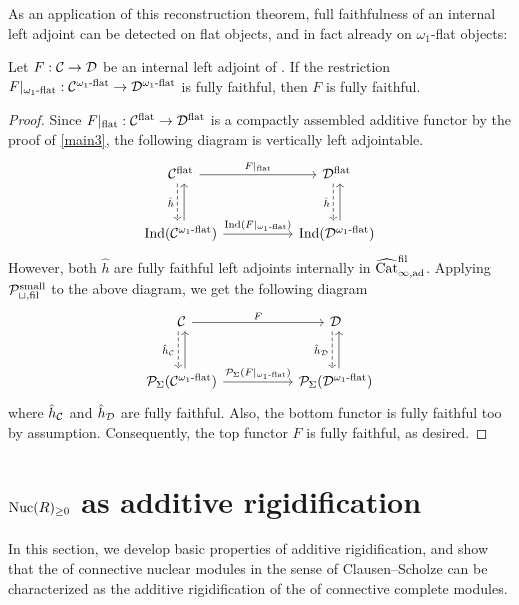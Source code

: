 \documentclass[a4paper,10pt, oneside]{amsart}
\begin{document}
	As an application of this reconstruction theorem, full faithfulness of an internal left adjoint can be detected on flat objects, and in fact already on \(\omega_1\)-flat objects:
	\begin{cor}
		Let $F:\mathcal{C}\to \mathcal{D}$ be an internal left adjoint of \dualaddinfcats. If the restriction $F|_{\omega_1\mathrm{\text{-}flat}}:\mathcal{C}^{\omega_1\text{-}\mathrm{flat}}\to\mathcal{D}^{\omega_1\mathrm{\text{-}flat}}$ is fully faithful, then $F$ is fully faithful.
	\end{cor}
	\begin{proof}
		Since $F|_{\mathrm{flat}}:\mathcal{C}^{\mathrm{flat}}\to\mathcal{D}^{\mathrm{flat}}$ is a compactly assembled additive functor by the proof of \cref{main3}, the following diagram is vertically left adjointable.
		$$
		\begin{tikzcd}[row sep=large, column sep=5em]
			\cflat \arrow[d, "\hat{h}"', dashed, shift right] \arrow[r, "F|_{\mathrm{flat}}"] & \dflat \arrow[d, "\hat{h}"', dashed, shift right] \\
			\op{Ind}(\cflatw) \arrow[r, "\op{Ind}(F|_{\omega_1\mathrm{\text{-}flat}})"] \arrow[u,  shift right]                   & \op{Ind}(\dflatw) \arrow[u,  shift right]                  
		\end{tikzcd}$$
		However, both $\hat{h}$ are  fully faithful left adjoints internally in $\widehat{\mathrm{Cat}}_{\infty,\mathrm{ad}}^{\mathrm{fil}}$. Applying $\mathcal{P}_{\sqcup,\mathrm{fil}}^{\mathrm{small}}$ to the above diagram, we get the following diagram
		$$
		\begin{tikzcd}[row sep=large, column sep=5em]
			\mcc \arrow[d, "\hat{h}_{\mcc}"', dashed, shift right] \arrow[r, "F"] & \mcd \arrow[d, "\hat{h}_{\mcd}"', dashed, shift right] \\
			\mcp_\Sigma(\cflatw) \arrow[r, "\mcp_{\Sigma}(F|_{\omega_1\mathrm{\text{-}flat}})"] \arrow[u,  shift right]                   & \mcp_\Sigma(\dflatw) \arrow[u,  shift right]                  
		\end{tikzcd}$$
		where $\hat{h}_{\mathcal{C}}$ and $\hat{h}_{\mathcal{D}}$ are fully faithful. Also, the bottom functor is fully faithful too by assumption. Consequently,  the top functor $F$ is fully faithful, as desired.
	\end{proof}
	\section{$\mathrm{Nuc}(R)_{\geq0}$ as additive rigidification}\label{section5}
	In this section, we develop basic properties of additive rigidification, and show that the \infcat of connective nuclear modules in the sense of Clausen--Scholze \cite{scholze2026lecturesanalyticgeometry}
 can be characterized as the additive rigidification of the \infcat of connective complete  modules. 
 
\end{document}
